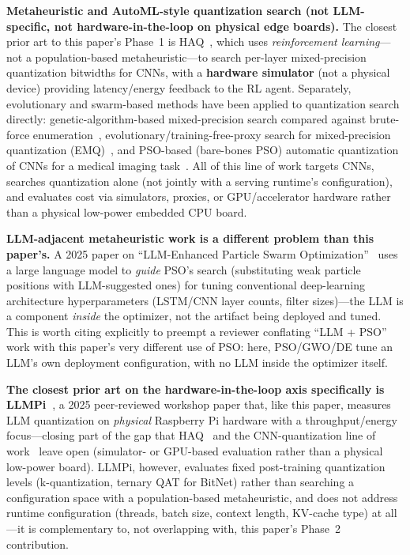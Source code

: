 \documentclass[journal]{IEEEtran}
\begin{document}
\textbf{Metaheuristic and AutoML-style quantization search (not LLM-specific, not hardware-in-the-loop on physical edge boards).} The closest prior art to this paper's Phase~1 is HAQ~\cite{ref12}, which uses \emph{reinforcement learning}---not a population-based metaheuristic---to search per-layer mixed-precision quantization bitwidths for CNNs, with a \textbf{hardware simulator} (not a physical device) providing latency/energy feedback to the RL agent. Separately, evolutionary and swarm-based methods have been applied to quantization search directly: genetic-algorithm-based mixed-precision search compared against brute-force enumeration~\cite{ref13}, evolutionary/training-free-proxy search for mixed-precision quantization (EMQ)~\cite{ref14}, and PSO-based (bare-bones PSO) automatic quantization of CNNs for a medical imaging task~\cite{ref15}. All of this line of work targets CNNs, searches quantization alone (not jointly with a serving runtime's configuration), and evaluates cost via simulators, proxies, or GPU/accelerator hardware rather than a physical low-power embedded CPU board.

\textbf{LLM-adjacent metaheuristic work is a different problem than this paper's.} A 2025 paper on ``LLM-Enhanced Particle Swarm Optimization''~\cite{ref16} uses a large language model to \emph{guide} PSO's search (substituting weak particle positions with LLM-suggested ones) for tuning conventional deep-learning architecture hyperparameters (LSTM/CNN layer counts, filter sizes)---the LLM is a component \emph{inside} the optimizer, not the artifact being deployed and tuned. This is worth citing explicitly to preempt a reviewer conflating ``LLM + PSO'' work with this paper's very different use of PSO: here, PSO/GWO/DE tune an LLM's own deployment configuration, with no LLM inside the optimizer itself.

\textbf{The closest prior art on the hardware-in-the-loop axis specifically is LLMPi~\cite{ref19}}, a 2025 peer-reviewed workshop paper that, like this paper, measures LLM quantization on \emph{physical} Raspberry Pi hardware with a throughput/energy focus---closing part of the gap that HAQ~\cite{ref12} and the CNN-quantization line of work~\cite{ref13,ref14,ref15} leave open (simulator- or GPU-based evaluation rather than a physical low-power board). LLMPi, however, evaluates fixed post-training quantization levels (k-quantization, ternary QAT for BitNet) rather than searching a configuration space with a population-based metaheuristic, and does not address runtime configuration (threads, batch size, context length, KV-cache type) at all---it is complementary to, not overlapping with, this paper's Phase~2 contribution.
\end{document}
